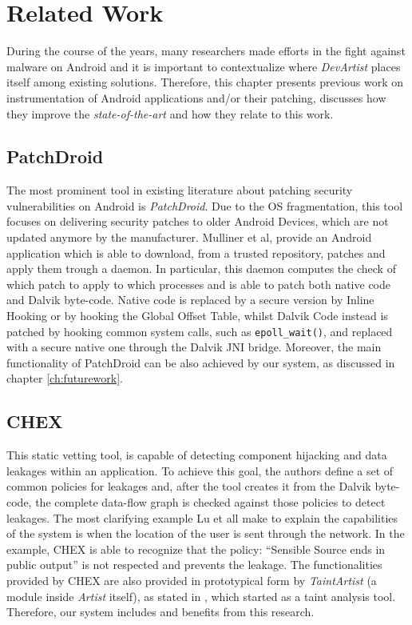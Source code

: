  \chapter{Related Work}
During the course of the years, many researchers made efforts in the fight against malware on Android and it is important to contextualize where \emph{DevArtist} places itself among existing solutions. Therefore, this chapter presents previous work on instrumentation of Android applications and/or their patching, discusses how they improve the \emph{state-of-the-art} and how they relate to this work.

\section{PatchDroid}
The most prominent tool in existing literature about patching security vulnerabilities on Android is \emph{PatchDroid}\cite{patchdroid}. Due to the OS fragmentation, this tool focuses on delivering security patches to older Android Devices, which are not updated anymore by the manufacturer. Mulliner et al, provide an Android application which is able to download, from a trusted repository, patches and apply them trough a daemon. In particular, this daemon computes the check of which patch to apply to which processes and is able to patch both native code and Dalvik byte-code.
Native code is replaced by a secure version by Inline Hooking or by hooking the Global Offset Table, whilst Dalvik Code instead is patched by hooking common system calls, such as \texttt{epoll\_wait()}, and replaced with a secure native one through the Dalvik JNI bridge. Moreover, the main functionality of PatchDroid can be also achieved by our system, as discussed in chapter \ref{ch:futurework}.

\section{CHEX}
This static vetting tool, is capable of detecting component hijacking and data leakages within an application. To achieve this goal, the authors define a set of common policies for leakages and, after the tool creates it from the Dalvik byte-code, the complete data-flow graph is checked against those policies to detect leakages. The most clarifying example Lu et all\cite{chex} make to explain the capabilities of the system is when the location of the user is sent through the network. In the example, CHEX is able to recognize that the policy: \enquote{Sensible Source ends in public output} is not respected and prevents the leakage. The functionalities provided by CHEX are also provided in prototypical form by \emph{TaintArtist} (a module inside \emph{Artist} itself), as stated in \cite{artist}, which started as a taint analysis tool. Therefore, our system includes and benefits from this research.

